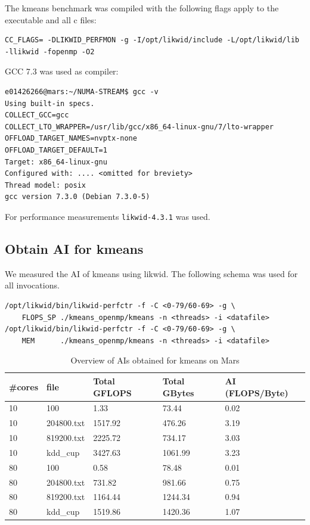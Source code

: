 The kmeans benchmark was compiled with the following flags apply to the executable and all c files:

\begin{verbatim}
CC_FLAGS= -DLIKWID_PERFMON -g -I/opt/likwid/include -L/opt/likwid/lib -llikwid -fopenmp -O2
\end{verbatim}

\noindent GCC 7.3 was used as compiler:

\begin{verbatim}
e01426266@mars:~/NUMA-STREAM$ gcc -v
Using built-in specs.
COLLECT_GCC=gcc
COLLECT_LTO_WRAPPER=/usr/lib/gcc/x86_64-linux-gnu/7/lto-wrapper
OFFLOAD_TARGET_NAMES=nvptx-none
OFFLOAD_TARGET_DEFAULT=1
Target: x86_64-linux-gnu
Configured with: .... <omitted for breviety>
Thread model: posix
gcc version 7.3.0 (Debian 7.3.0-5)
\end{verbatim}

\noindent For performance measurements \texttt{likwid-4.3.1} was used.

\subsection{Obtain AI for kmeans}

We measured the AI of kmeans using likwid. The following schema was used for all invocations.
\begin{verbatim}
/opt/likwid/bin/likwid-perfctr -f -C <0-79/60-69> -g \
    FLOPS_SP ./kmeans_openmp/kmeans -n <threads> -i <datafile>
/opt/likwid/bin/likwid-perfctr -f -C <0-79/60-69> -g \
    MEM      ./kmeans_openmp/kmeans -n <threads> -i <datafile>
\end{verbatim}



\begin{table}[h]
\centering
\caption{\label{tab:ai_tab}Overview of AIs obtained for kmeans on Mars}
\begin{small}
\begin{tabular}{lllll}
\toprule
\#cores & file & Total GFLOPS & Total GBytes & AI (FLOPS/Byte) \\
\midrule
10 & 100 & 1.33 & 73.44 & 0.02 \\
10 & 204800.txt & 1517.92 & 476.26 & 3.19 \\
10 & 819200.txt & 2225.72 & 734.17 & 3.03 \\
10 & kdd\_cup & 3427.63 & 1061.99 & 3.23 \\
80 & 100 & 0.58 & 78.48 & 0.01 \\
80 & 204800.txt & 731.82 & 981.66 & 0.75 \\
80 & 819200.txt & 1164.44 & 1244.34 & 0.94 \\
80 & kdd\_cup & 1519.86 & 1420.36 & 1.07 \\
\bottomrule
\end{tabular}
\end{small}
\end{table}

